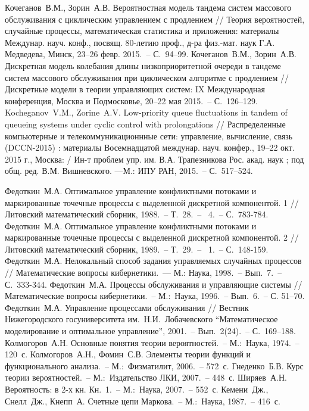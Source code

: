 \documentclass[a4paper,12pt,russian]{extarticle}
\newcommand{\No}{\textnumero}
\begin{document}
\begin{thebibliography}{99}
 Кочеганов~В.М., Зорин~А.В. Вероятностная модель тандема систем массового обслуживания с циклическим управлением с продлением // Теория вероятностей, случайные процессы, математическая статистика и приложения: материалы Междунар. науч. конф., посвящ. 80-летию проф., д-ра физ.-мат. наук Г.А. Медведева, Минск, 23–26 февр. 2015.~-- С.~94–99.
 Кочеганов~В.М., Зорин~А.В. Дискретная модель колебания длины низкоприоритетной очереди в тандеме систем массового обслуживания при циклическом алгоритме с продлением // Дискретные модели в теории управляющих систем: IX Международная конференция, Москва и Подмосковье, 20–22 мая 2015.~-- С.~126–129.
 Kocheganov~V.M., Zorine~A.V. Low-priority queue fluctuations in tandem of queueing systems under cyclic control with prolongations // Распределенные компьютерные и телекоммуникационнные сети: управление, вычисление, связь (DCCN-2015) : материалы Восемнадцатой междунар. науч. конфер., 19–22 окт. 2015 г., Москва: / Ин-т проблем упр. им. В.А. Трапезникова Рос. акад. наук ; под общ. ред. В.М. Вишневского. —М.: ИПУ РАН, 2015.~-- С.~517–524.

 Федоткин~М.А. Оптимальное управление конфликтными потоками и маркированные точечные процессы с выделенной дискретной компонентой. 1 // Литовский математический сборник, 1988.~-- Т.~28.~-- \No{}~4.~-- С.~783-784.
 Федоткин~М.А. Оптимальное управление конфликтными потоками и маркированные точечные процессы с выделенной дискретной компонентой. 2 // Литовский математический сборник, 1989.~-- Т.~29.~-- \No{}~1.~-- С.~148-159.
 Федоткин~М.А. Нелокальный способ задания управляемых случайных процессов // Математические вопросы кибернетики.~--- М.: Наука, 1998.~-- Вып.~7.~-- С.~333-344.
 Федоткин~М.А. Процессы обслуживания и управляющие системы // Математические вопросы кибернетики.~-- М.:~Наука, 1996.~-- Вып.~6.~-- С. 51--70.
 Федоткин~М.А. Управление процессами обслуживания // Вестник Нижегородского госуниверситета им.~Н.И.~Лобачевского “Математическое моделирование и оптимальное управление”, 2001.~-- Вып.~2(24).~-- С.~169--188.
 Колмогоров~А.Н. Основные понятия теории вероятностей.~-- М.:~Наука, 1974.~-- 120~с.
 Колмогоров~А.Н., Фомин~С.В. Элементы теории функций и функционального анализа.~-- М.:~Физматилит, 2006.~-- 572~с.
 Гнеденко~Б.В. Курс теории вероятностей.~-- М.:~Издательство ЛКИ, 2007.~-- 448~с.
 Ширяев~А.Н. Вероятность: в 2-х кн. Кн.~1.~-- М.:~Наука, 2007.~-- 552~с.
 Кемени~Дж., Снелл~Дж., Кнепп~А. Счетные цепи Маркова.~-- М.:~Наука, 1987.~-- 416~с.
\end{thebibliography}
\end{document}
